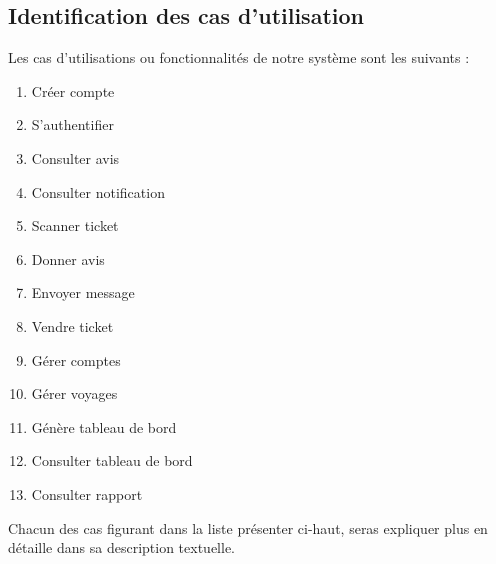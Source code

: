     \subsection[Identification des cas d’utilisation]{Identification des cas d’utilisation}
    Les cas d’utilisations ou fonctionnalités de notre
    système sont les suivants :
    \par
        \begin{enumerate}
            \setlength{\itemsep}{0pt}
            \item Créer compte
            \item S’authentifier
            \item Consulter avis
            \item Consulter notification
            \item Scanner ticket
            \item Donner avis
            \item Envoyer message
            \item Vendre ticket
            \item Gérer comptes
            \item Gérer voyages
            \item Génère tableau de bord
            \item Consulter tableau de bord
            \item Consulter rapport
        \end{enumerate}
    Chacun des cas figurant dans la liste présenter
    ci-haut, seras expliquer plus en détaille dans
    sa description textuelle.
\pagebreak
